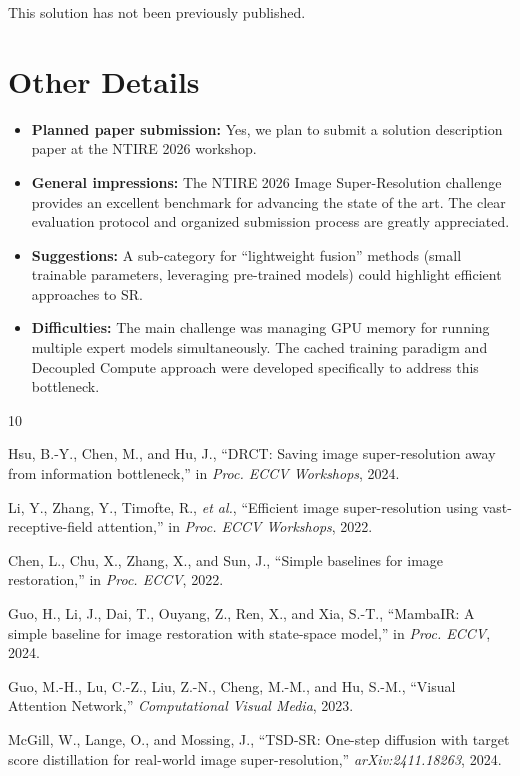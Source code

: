 \documentclass[10pt,twocolumn,letterpaper]{article}
\begin{document}
This solution has not been previously published.

\section{Other Details}

\begin{itemize}[nosep,leftmargin=*]
\item \textbf{Planned paper submission:} Yes, we plan to submit a solution description paper at the NTIRE 2026 workshop.
\item \textbf{General impressions:} The NTIRE 2026 Image Super-Resolution challenge provides an excellent benchmark for advancing the state of the art. The clear evaluation protocol and organized submission process are greatly appreciated.
\item \textbf{Suggestions:} A sub-category for ``lightweight fusion'' methods (small trainable parameters, leveraging pre-trained models) could highlight efficient approaches to SR.
\item \textbf{Difficulties:} The main challenge was managing GPU memory for running multiple expert models simultaneously. The cached training paradigm and Decoupled Compute approach were developed specifically to address this bottleneck.
\end{itemize}

{\small


\begin{thebibliography}{10}

Hsu, B.-Y., Chen, M., and Hu, J.,
``DRCT: Saving image super-resolution away from information bottleneck,''
in \emph{Proc. ECCV Workshops}, 2024.

Li, Y., Zhang, Y., Timofte, R., \emph{et al.},
``Efficient image super-resolution using vast-receptive-field attention,''
in \emph{Proc. ECCV Workshops}, 2022.

Chen, L., Chu, X., Zhang, X., and Sun, J.,
``Simple baselines for image restoration,''
in \emph{Proc. ECCV}, 2022.

Guo, H., Li, J., Dai, T., Ouyang, Z., Ren, X., and Xia, S.-T.,
``MambaIR: A simple baseline for image restoration with state-space model,''
in \emph{Proc. ECCV}, 2024.

Guo, M.-H., Lu, C.-Z., Liu, Z.-N., Cheng, M.-M., and Hu, S.-M.,
``Visual Attention Network,''
\emph{Computational Visual Media}, 2023.

McGill, W., Lange, O., and Mossing, J.,
``TSD-SR: One-step diffusion with target score distillation for real-world image super-resolution,''
\emph{arXiv:2411.18263}, 2024.

\end{thebibliography}
}
\end{document}
